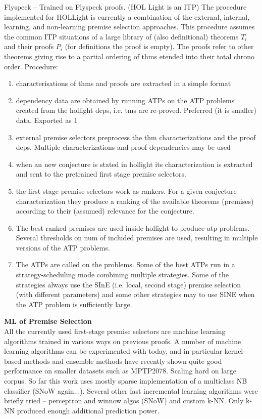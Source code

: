 \documentclass{article}
\begin{document}
Flyspeck \cite{Flyspeck} -- Trained on Flyspeck proofs. (HOL Light is an ITP)
The procedure implemented for HOLLight is currently a combination of the
external, internal, learning, and non-learning premise selection approaches.
This procedure assumes the common ITP situations of a large library of (also
definitional) theorems $T_i$ and their proofs $P_i$ (for definitions the proof
is empty). The proofs refer to other theorems giving rise to a partial ordering
of thms etended into their total chrono order. Procedure:
\begin{enumerate}
    \item characterisations of thms and proofs are extracted in a simple format
    \item dependency data are obtained by running ATPs on the ATP problems created from the hollight deps, i.e. tms are re-proved. Preferred (it is smaller) data. Exported as 1
    \item external premise selectors preprocess the thm characterizations and the proof deps. Multiple characterizations and proof dependencies may be used
    \item when an new conjecture is stated in hollight its characterization is extracted and sent to the pretrained first stage premise selectors.
    \item the first stage premise selectors work as rankers. For a given conjecture characterization they produce a ranking of the available theorems (premises) according to their (assumed) relevance for the conjecture.
    \item The best ranked premises are used inside hollight to produce atp problems. Several thresholds on num of included premises are used, resulting in multiple versions of the ATP problems.
    \item The ATPs are called on the problems. Some of the best ATPs run in a strategy-scheduling mode combining multiple strategies. Some of the strategies always use the SInE (i.e. local, second stage) premise selection (with different parameters) and some other strategies may to use SINE when the ATP problem is sufficiently large.
\end{enumerate}
\textbf{ML of Premise Selection}\\
All the currently used first-stage premise selectors are machine learning
algorithms trained in various ways on previous proofs. A number of machine
learning algorithms can be experimented with today, and in particular
kernel-based methods and ensemble methods have recently shown quite good
performance on smaller datasets such as MPTP2078. Scaling hard on large corpus.
So far this work uses mostly sparse implementation of a multiclass NB
classifier (SNoW again...). Several other fast incremental learning algorithms
were briefly tried -- perceptron and winnow algos (SNoW) and custom k-NN. Only
k-NN produced enough additional prediction power. 
\end{document}
